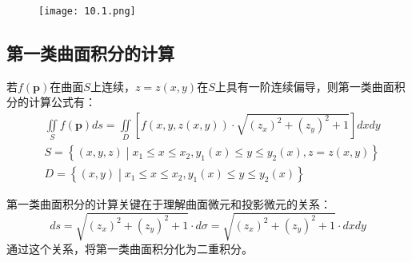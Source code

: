 \begin{figure}[h]
\centering
\texttt{[image: 10.1.png]}
\end{figure}

\subsection{第一类曲面积分的计算}

\begin{theorem}[第一类曲面积分的计算公式]
若$f\left( \boldsymbol{p} \right) $在曲面$S$上连续，$z=z\left( x,y \right) $在$S$上具有一阶连续偏导，则第一类曲面积分的计算公式有：
\begin{align*}
&\iint\limits_S{f\left( \boldsymbol{p} \right) ds}=\iint\limits_D{\left[ f\left( x,y,z\left( x,y \right) \right) \cdot \sqrt{\left( z_x \right) ^2+\left( z_y \right) ^2+1} \right] dxdy} \\
&S=\left\{ \left( x,y,z \right) \middle| x_1\leqslant x\leqslant x_2,y_1\left( x \right) \leqslant y\leqslant y_2\left( x \right) ,z=z\left( x,y \right) \right\} \\
&D=\left\{ \left( x,y \right) \middle| x_1\leqslant x\leqslant x_2,y_1\left( x \right) \leqslant y\leqslant y_2\left( x \right) \right\}
\end{align*}
\end{theorem}

第一类曲面积分的计算关键在于理解曲面微元和投影微元的关系：
\[
ds=\sqrt{\left( z_x \right) ^2+\left( z_y \right) ^2+1}\cdot d\sigma =\sqrt{\left( z_x \right) ^2+\left( z_y \right) ^2+1}\cdot dxdy
\]
通过这个关系，将第一类曲面积分化为二重积分。





